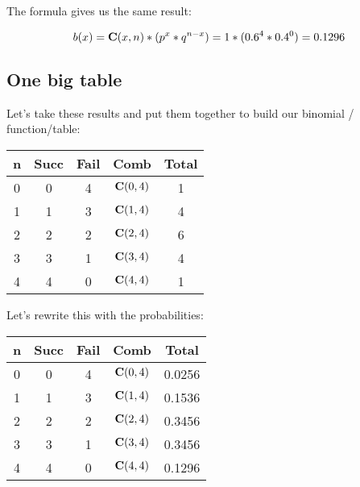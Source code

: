 \documentclass[../../../main.tex]{subfiles}
\begin{document}
The formula gives us the same result:

\begin{equation*}
  \Binom{\RandVarVal/} = \combs{\RandVarVal/}{n} * (p^{\RandVarVal/} * q^{n - \RandVarVal/}) = 1 * (0.6^{4} * 0.4^{0}) = 0.1296
\end{equation*}


\subsection{One big table}

Let's take these results and put them together to build our binomial \PDFtext/ function/table:

\begin{center}
  \begin{tabular}{| c | c | c | c | c |}
    \hline
  \textbf{n} & \textbf{Succ} & \textbf{Fail} & \textbf{Comb} & \textbf{Total} \\ \hline
  0 & 0    & 4    & $\mathbf{C}(0, 4)$ & 1 \\ \hline
  1 & 1    & 3    & $\mathbf{C}(1, 4)$ & 4 \\ \hline
  2 & 2    & 2    & $\mathbf{C}(2, 4)$ & 6 \\ \hline
  3 & 3    & 1    & $\mathbf{C}(3, 4)$ & 4 \\ \hline
  4 & 4    & 0    & $\mathbf{C}(4, 4)$ & 1 \\ \hline
  \end{tabular}
\end{center}

\noindent
Let's rewrite this with the probabilities:

\begin{center}
  \begin{tabular}{| c | c | c | c | c |}
    \hline
  \textbf{n} & \textbf{Succ} & \textbf{Fail} & \textbf{Comb} & \textbf{Total} \\ \hline
  0 & 0    & 4    & $\mathbf{C}(0, 4)$ & 0.0256 \\ \hline
  1 & 1    & 3    & $\mathbf{C}(1, 4)$ & 0.1536 \\ \hline
  2 & 2    & 2    & $\mathbf{C}(2, 4)$ & 0.3456 \\ \hline
  3 & 3    & 1    & $\mathbf{C}(3, 4)$ & 0.3456 \\ \hline
  4 & 4    & 0    & $\mathbf{C}(4, 4)$ & 0.1296 \\ \hline
  \end{tabular}
\end{center}
\end{document}
